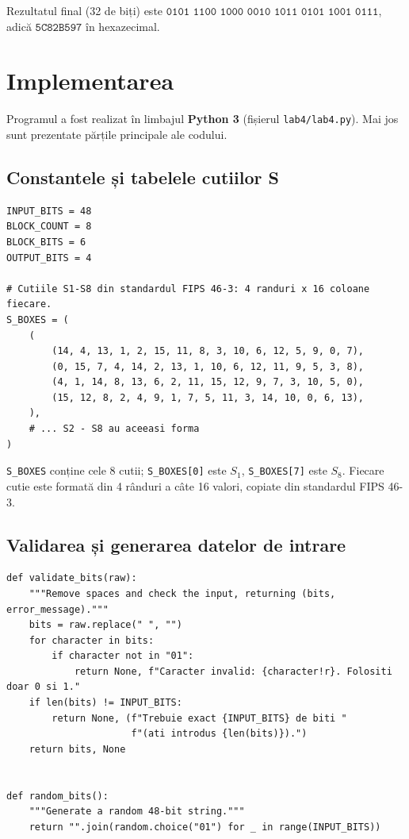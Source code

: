 \documentclass[12pt,a4paper]{article}
\begin{document}
Rezultatul final (32 de biți) este
$\texttt{0101 1100 1000 0010 1011 0101 1001 0111}$, adică
$\texttt{5C82B597}$ în hexazecimal.

\section{Implementarea}

Programul a fost realizat în limbajul \textbf{Python 3} (fișierul
\texttt{lab4/lab4.py}). Mai jos sunt prezentate părțile principale ale codului.

\subsection{Constantele și tabelele cutiilor S}

\begin{lstlisting}[caption={Parametrii și începutul tabelelor S (FIPS 46-3)}]
INPUT_BITS = 48
BLOCK_COUNT = 8
BLOCK_BITS = 6
OUTPUT_BITS = 4

# Cutiile S1-S8 din standardul FIPS 46-3: 4 randuri x 16 coloane fiecare.
S_BOXES = (
    (
        (14, 4, 13, 1, 2, 15, 11, 8, 3, 10, 6, 12, 5, 9, 0, 7),
        (0, 15, 7, 4, 14, 2, 13, 1, 10, 6, 12, 11, 9, 5, 3, 8),
        (4, 1, 14, 8, 13, 6, 2, 11, 15, 12, 9, 7, 3, 10, 5, 0),
        (15, 12, 8, 2, 4, 9, 1, 7, 5, 11, 3, 14, 10, 0, 6, 13),
    ),
    # ... S2 - S8 au aceeasi forma
)
\end{lstlisting}

\texttt{S\_BOXES} conține cele 8 cutii; \texttt{S\_BOXES[0]} este $S_1$,
\texttt{S\_BOXES[7]} este $S_8$. Fiecare cutie este formată din 4 rânduri a câte
16 valori, copiate din standardul FIPS 46-3.

\subsection{Validarea și generarea datelor de intrare}

\begin{lstlisting}[caption={Verificarea celor 48 de biți și generarea aleatorie}]
def validate_bits(raw):
    """Remove spaces and check the input, returning (bits, error_message)."""
    bits = raw.replace(" ", "")
    for character in bits:
        if character not in "01":
            return None, f"Caracter invalid: {character!r}. Folositi doar 0 si 1."
    if len(bits) != INPUT_BITS:
        return None, (f"Trebuie exact {INPUT_BITS} de biti "
                      f"(ati introdus {len(bits)}).")
    return bits, None


def random_bits():
    """Generate a random 48-bit string."""
    return "".join(random.choice("01") for _ in range(INPUT_BITS))
\end{lstlisting}
\end{document}
